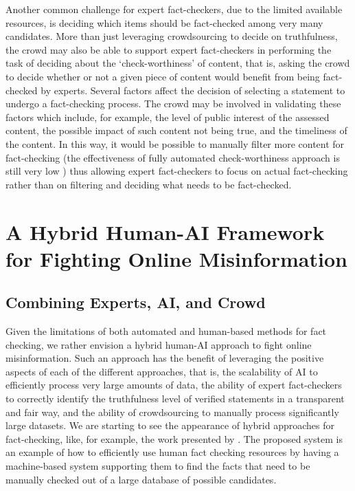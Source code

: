 \documentclass[11pt]{article}
\begin{document}
Another common challenge for expert fact-checkers, due to the limited available resources, is  deciding which items should be fact-checked among very many candidates.
% 
More than just leveraging crowdsourcing to decide on truthfulness, the crowd may also be able to support expert fact-checkers in performing the task of deciding about the `check-worthiness' of content, that is, asking the crowd to decide whether or not a given piece of content would benefit from being fact-checked by experts.
% 
Several factors affect the decision of selecting a statement to undergo a fact-checking process. 
The crowd may be involved in validating these factors which include,
for example, the level of public interest of the assessed content, the possible impact of such content not being true, and the timeliness of the content.
In this way, it would be possible to manually filter more content for fact-checking (the effectiveness of fully automated check-worthiness approach is still very low \cite{checkthat}) thus allowing  expert fact-checkers to focus on actual fact-checking rather than on filtering and deciding what needs to be fact-checked. 

\section{A Hybrid Human-AI Framework for Fighting Online Misinformation}
\label{sec:hybrid}

\subsection{Combining Experts, AI, and Crowd}

Given the limitations of both automated and human-based methods for fact checking, we rather envision a hybrid human-AI approach to fight online misinformation. Such an approach has the benefit of leveraging the positive aspects of each of the different approaches, that is, the scalability of AI to efficiently process very large amounts of data, the ability of expert fact-checkers to correctly identify the truthfulness level of verified statements in a transparent and fair way, and the ability of crowdsourcing to manually process significantly large datasets.
% 
We are starting to see the appearance of hybrid approaches for fact-checking, like, for example, the work presented by \citet{scrutinizer}. The proposed system is an example of how to efficiently use human fact checking resources by having a machine-based system supporting them to find the facts that need to be manually checked out of a large database of possible candidates.
\end{document}
